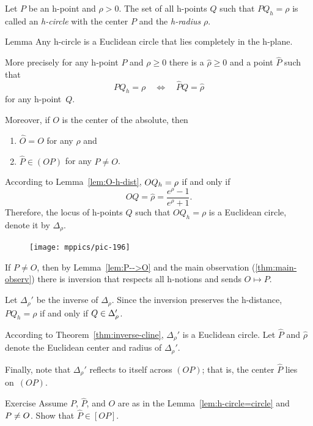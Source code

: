 Let $P$ be an h-point and $\rho>0$.
The set of all h-points $Q$ such that $PQ_h=\rho$ is called an \emph{h-circle} with the center $P$ and the \emph{h-radius} $\rho$.

\begin{thm}{Lemma}\label{lem:h-circle=circle}
Any h-circle is a Euclidean circle that lies completely in the h-plane.

More precisely for any h-point $P$ and $\rho\ge 0$
there is a $\hat\rho\ge 0$ and a point $\hat P$ such that 
$$PQ_h= \rho
\quad 
\iff
\quad
\hat PQ= \hat\rho$$
for any h-point~$Q$.

Moreover, if $O$ is the center of the absolute, then 
\begin{enumerate}
\item $\hat O=O$ for any $\rho$ and
\item $\hat P\in (OP)$ for any $P\ne O$.
\end{enumerate}

\end{thm}

According to Lemma~\ref{lem:O-h-dist}, 
$OQ_h\z= \rho$ if and only if $$OQ= \hat\rho=\frac{e^\rho-1}{e^\rho+1}.$$
Therefore, the locus of h-points $Q$ such that $OQ_h= \rho$ is a Euclidean circle, 
denote it by $\Delta_\rho$.

\begin{figure}
\vskip-3mm
\centering
\texttt{[image: mppics/pic-196]}
\end{figure}

If $P\ne O$, then by Lemma~\ref{lem:P-->O} and the main observation (\ref{thm:main-observ})
there is inversion that respects all h-notions and sends $O\mapsto P$.

Let $\Delta_\rho'$ be the inverse of $\Delta_\rho$.
Since the inversion preserves the h-distance,
$PQ_h=\rho$ if and only if $Q\z\in\Delta_\rho'$.

According to Theorem~\ref{thm:inverse-cline}, $\Delta_\rho'$ is a Euclidean circle.
Let $\hat P$ and $\hat\rho$ denote the Euclidean center and radius of $\Delta_\rho'$.

Finally, note that $\Delta_\rho'$ reflects to itself across $(OP)$;
that is, the center $\hat P$ lies on~$(OP)$.
\qeds

\begin{thm}{Exercise}\label{ex:h-circle=circle}
Assume $P$, $\hat P$, and $O$ are as in the Lemma~\ref{lem:h-circle=circle} and $P\z\ne O$.
Show that $\hat P\in [OP]$.
\end{thm}

